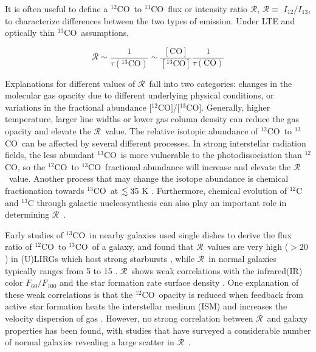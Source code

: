 \documentclass{emulateapj}
\def\ttco{\mbox{$^{13}$CO}}
\def\twco{\mbox{$^{12}$CO}}
\def\rtt{$\mathcal{R}$}
\def\itw{$I_{12}$}
\def\itt{$I_{13}$}
\begin{document}
It is often useful to define a \twco \ to \ttco \ flux or intensity ratio \rtt,
$\mathcal{R} \equiv $ \itw $/$\itt,
to characterize  differences between the two types of emission.
Under LTE and optically thin \ttco \ assumptions,

\begin{equation} 
\mathcal{R} \sim \frac{1}{\tau(\mathrm{^{13}CO})} \sim  \frac{[\mathrm{CO}]}{[\mathrm{^{13}CO}]} \frac{1}{\tau(\mathrm{CO})} 
\end{equation}

Explanations for different values of \rtt \  fall into two categories:
changes in the molecular gas opacity due to different underlying physical conditions, 
or variations in  the fractional abundance $[$\twco$]/[$\ttco$]$.
Generally, higher temperature, larger line widths or lower gas column density can reduce
the gas opacity and elevate the \rtt \ value.
The relative isotopic abundance of \twco \ to \ttco \ can be affected by several different
processes. In strong interstellar radiation fields, the less abundant \ttco \ is more
vulnerable to the photodissociation than \twco, so the \twco \ to \ttco \ fractional abundance
will increase and elevate the \rtt \ value.
Another process that may change the isotope abundance is chemical fractionation 
towards \ttco \ at $ \lesssim 35 \rm \  K$ \citep{Watson1976}.
Furthermore, chemical evolution of $^{12}$C and $^{13}$C through galactic nucleosynthesis
can also play an important role in determining \rtt \ \citep{Henkel1993, Prantzos1996}.

Early studies of \ttco \ in nearby galaxies
used single dishes to derive the flux ratio of  \twco \ to \ttco \ of a galaxy,
and found that \rtt \ values are very high ($>20$) in (U)LIRGs which host 
strong starbursts \citep[e.g.][]{Aalto1991,Casoli1992},
while \rtt \ in normal galaxies typically ranges from 5 to 15
\citep[e.g.][]{Y&S1986, S&I1991, Aalto1995, Paglione2001}.
 \rtt \ shows weak correlations with the infrared(IR) color $F_{60}/F_{100}$
\citep{Aalto1991, Crocker2012} and the star formation rate surface density \citep{Davis2014}.
One explanation of these weak correlations
is that  the \twco \  opacity is reduced when feedback from active star formation
heats the interstellar medium (ISM) and increases the velocity dispersion of gas
\citep{Crocker2012,Davis2014}.
However, no strong correlation between \rtt \ and
galaxy properties has been found,
with studies that have
surveyed a considerable number of normal galaxies revealing
a large scatter in \rtt \ \citep{Aalto1995, Vila-Vilaro2015}.
\end{document}
